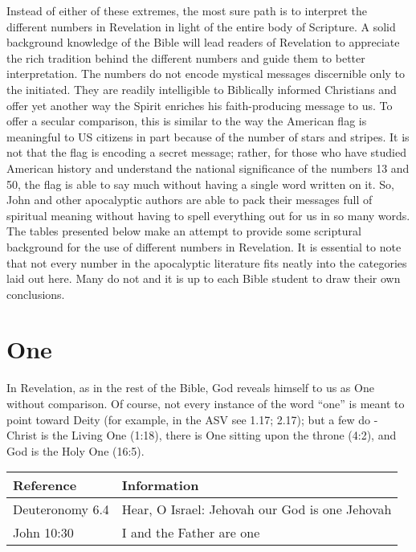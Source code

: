 Instead of either of these extremes, the most sure path is to interpret the different numbers in Revelation in light of the entire body of Scripture. A solid background knowledge of the Bible will lead readers of Revelation to appreciate the rich tradition behind the different numbers and guide them to better interpretation. The numbers do not encode mystical messages discernible only to the initiated. They are readily intelligible to Biblically informed Christians and offer yet another way the Spirit enriches his faith-producing message to us. To offer a secular comparison, this is similar to the way the American flag is meaningful to US citizens in part because of the number of stars and stripes. It is not that the flag is encoding a secret message; rather, for those who have studied American history and understand the national significance of the numbers 13 and 50, the flag is able to say much without having a single word written on it. So, John and other apocalyptic authors are able to pack their messages full of spiritual meaning without having to spell everything out for us in so many words.
\newline\newline
The tables presented below make an attempt to provide some scriptural background for the use of different numbers in Revelation. It is essential to note that not every number in the apocalyptic literature fits neatly into the categories laid out here. Many do not and it is up to each Bible student to draw their own conclusions.

\section*{One}

In Revelation, as in the rest of the Bible, God reveals himself to us as One without comparison. Of course, not every instance of the word ``one'' is meant to point toward Deity (for example, in the ASV see 1.17; 2.17); but a few do - Christ is the Living One (1:18), there is One sitting upon the throne (4:2), and God is the Holy One (16:5).
\newline\newline
\begin{tabularx}{\textwidth}{l X}
\toprule
\textbf{Reference} & \textbf{Information}\\ 
\midrule
Deuteronomy 6.4 & Hear, O Israel: Jehovah our God is one Jehovah \\
\addlinespace
John 10:30 & I and the Father are one \\
\bottomrule
\end{tabularx}
	

